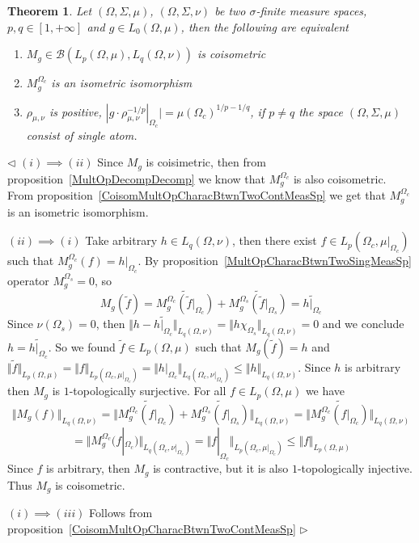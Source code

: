\documentclass[12pt]{article}
\newtheorem{theorem}{Theorem}[subsection]
\newenvironment{proof}{\par $\triangleleft$}{$\triangleright$}
\begin{document}
\begin{theorem}\label{CoisomMultOpCharacBtwnTwoMeasSp}
    Let $(\Omega,\Sigma,\mu)$, $(\Omega,\Sigma,\nu)$ be two $\sigma$-finite
    measure spaces, $p,q\in[1,+\infty]$ and $g\in L_0(\Omega,\mu)$, then the
    following are equivalent
    \begin{enumerate}[label = (\roman*)]
        \item $M_g\in\mathcal{B}(L_p(\Omega,\mu), L_q(\Omega,\nu))$ is
              coisometric

        \item $M_g^{\Omega_c}$ is an isometric isomorphism

        \item $\rho_{\mu,\nu}$ is positive,
              $|g\cdot\rho_{\mu,\nu}^{-1/p}|_{\Omega_c}|
                ={\mu(\Omega_c)}^{1/p-1/q}$,
              if $p\neq q$ the space $(\Omega,\Sigma,\mu)$ 
              consist of single atom.
    \end{enumerate}
\end{theorem}
\begin{proof} $(i)\implies (ii)$ Since $M_g$ is coisimetric, then from
    proposition~\ref{MultOpDecompDecomp} we know that $M_g^{\Omega_c}$ is also
    coisometric. From proposition~\ref{CoisomMultOpCharacBtwnTwoContMeasSp} we
    get that $M_g^{\Omega_c}$ is an isometric isomorphism.

    $(ii)\implies (i)$ Take arbitrary $h\in L_q(\Omega,\nu)$, then there
    exist $f\in L_p(\Omega_c,\mu|_{\Omega_c})$ such that
    $M_g^{\Omega_c}(f)=h|_{\Omega_c}$. By
    proposition~\ref{MultOpCharacBtwnTwoSingMeasSp} operator
    $M_g^{\Omega_s}=0$, so
    $$
        M_g(\widetilde{f})
        =\widetilde{M_g^{\Omega_c}(\widetilde{f}|_{\Omega_c})}
        +\widetilde{M_g^{\Omega_s}(\widetilde{f}|_{\Omega_s})}
        =\widetilde{h|_{\Omega_c}}
    $$
    Since $\nu(\Omega_s)=0$, then
    $\Vert h-\widetilde{h|_{\Omega_c}}\Vert_{L_q(\Omega,\nu)}
        =\Vert h\chi_{\Omega_s}\Vert_{L_q(\Omega,\nu)}=0$ and we conclude
    $h=\widetilde{h|_{\Omega_c}}$. So we found
    $\widetilde{f}\in L_p(\Omega,\mu)$ such that
    $M_g(\widetilde{f})=h$ and
    $\Vert \widetilde{f}\Vert_{L_p(\Omega,\mu)}
        =\Vert f\Vert_{L_p(\Omega_c,\mu|_{\Omega_c})}
        =\Vert h|_{\Omega_c}\Vert_{L_q(\Omega_c,\nu|_{\Omega_c})}
        \leq\Vert h\Vert_{L_q(\Omega,\nu)}$. Since $h$ is arbitrary then
    $M_g$ is $1$-topologically surjective. For all
    $f\in L_p(\Omega,\mu)$ we have
    $$
        \Vert M_g(f)\Vert_{L_q(\Omega,\nu)}
        =\Vert\widetilde{M_g^{\Omega_c}(f|_{\Omega_c})}
        +\widetilde{M_g^{\Omega_s}(f|_{\Omega_s})}\Vert_{L_q(\Omega,\nu)}
        =\Vert\widetilde{M_g^{\Omega_c}(f|_{\Omega_c})}\Vert_{L_q(\Omega,\nu)}
    $$
    $$
        =\Vert
        M_g^{\Omega_c}(f|_{\Omega_c})\Vert_{L_q(\Omega_c,\nu|_{\Omega_c})}
        =\Vert f|_{\Omega_c}\Vert_{L_p(\Omega_c,\mu|_{\Omega_c})} \leq\Vert f
        \Vert_{L_p(\Omega,\mu)}
    $$
    Since $f$ is arbitrary, then $M_g$ is contractive, but it is also
    $1$-topologically injective. Thus $M_g$ is coisometric.

    $(i)\implies (iii)$ Follows from
    proposition~\ref{CoisomMultOpCharacBtwnTwoContMeasSp}
\end{proof}
\end{document}
